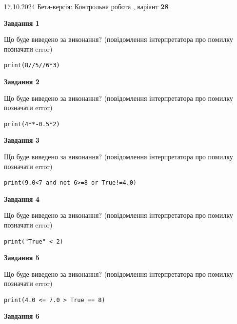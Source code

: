 \documentclass[12pt, ukrainian]{article}
\begin{document}
{\Large{17.10.2024 Бета-версія: Контрольна робота , варіант  \No \textbf { 28 }\par}}
{
\begin {large}
{\begin {center}\textbf{Завдання 1}\end {center}}

Що буде виведено за виконання? (повідомлення інтерпретатора про помилку позначати error)\par
\begin{verbatim}
print(8//5//6*3)
\end{verbatim}

{\begin {center}\textbf{Завдання 2}\end {center}}

Що буде виведено за виконання? (повідомлення інтерпретатора про помилку позначати error)\par
\begin{verbatim}
print(4**-0.5*2)
\end{verbatim}

{\begin {center}\textbf{Завдання 3}\end {center}}

Що буде виведено за виконання? (повідомлення інтерпретатора про помилку позначати error)\par
\begin{verbatim}
print(9.0<7 and not 6>=8 or True!=4.0)
\end{verbatim}

{\begin {center}\textbf{Завдання 4}\end {center}}

Що буде виведено за виконання? (повідомлення інтерпретатора про помилку позначати error)\par
\begin{verbatim}
print("True" < 2)
\end{verbatim}

{\begin {center}\textbf{Завдання 5}\end {center}}

Що буде виведено за виконання? (повідомлення інтерпретатора про помилку позначати error)\par
\begin{verbatim}
print(4.0 <= 7.0 > True == 8)
\end{verbatim}

{\begin {center}\textbf{Завдання 6}\end {center}}


\end{large}}
\end{document}
